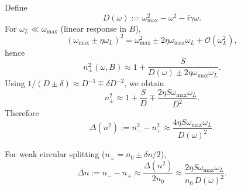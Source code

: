 \documentclass[10pt]{article}
\begin{document}
            Define
            \begin{equation}
                D(\omega):=\omega_{\max}^2-\omega^2-i\gamma\omega .
                \label{eq:sst-faraday-D}
            \end{equation}
            For \(\omega_L\ll \omega_{\max}\) (linear response in \(B\)),
            \begin{equation}
                \left(\omega_{\max}\pm \eta\omega_L\right)^2
                =
                \omega_{\max}^2 \pm 2\eta\omega_{\max}\omega_L+\mathcal{O}(\omega_L^2),
                \label{eq:sst-faraday-cutoff-expansion}
            \end{equation}
            hence
            \begin{equation}
                n_\pm^2(\omega,B)\approx 1+\frac{S}{D(\omega)\pm 2\eta\omega_{\max}\omega_L}.
                \label{eq:sst-faraday-npm-denom-linearized}
            \end{equation}
            Using \(1/(D\pm \delta)\approx D^{-1}\mp \delta D^{-2}\), we obtain
            \begin{equation}
                n_\pm^2
                \approx
                1+\frac{S}{D}
                \mp
                \frac{2\eta S\omega_{\max}\omega_L}{D^2}.
                \label{eq:sst-faraday-npm-expanded}
            \end{equation}
            Therefore
            \begin{equation}
                \Delta(n^2):=n_-^2-n_+^2
                \approx
                \frac{4\eta S\omega_{\max}\omega_L}{D(\omega)^2}.
                \label{eq:sst-faraday-delta-n2}
            \end{equation}

            For weak circular splitting (\(n_\pm=n_0\pm \delta n/2\)),
            \begin{equation}
                \Delta n:=n_- - n_+
                \approx
                \frac{\Delta(n^2)}{2n_0}
                \approx
                \frac{2\eta S\omega_{\max}\omega_L}{n_0\,D(\omega)^2}.
                \label{eq:sst-faraday-delta-n}
            \end{equation}
\end{document}
